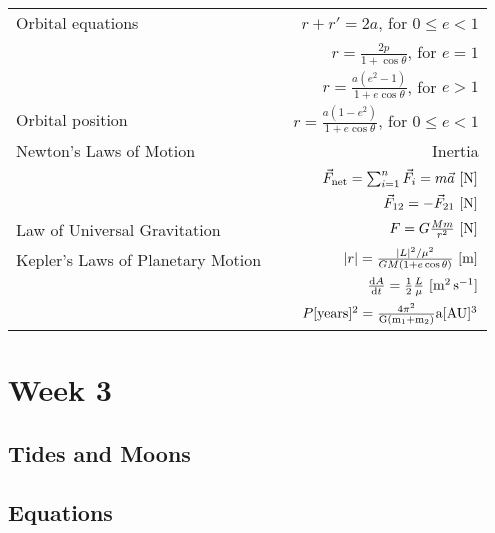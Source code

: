 \documentclass[a4paper,10pt]{article}
\begin{document}
\begin{tabularx}{\textwidth}{ l X r }

    Orbital equations && $r + r' = 2a$, for $0\leq e<1$ \\[0.3cm]
                      && $r = \frac{2p}{1+\cos\theta}$, for $e=1$ \\[0.3cm]
                      && $r = \frac{a(e^2-1)}{1+e\cos\theta}$, for $e>1$ \\[0.3cm]

    Orbital position && $r = \frac{a(1-e^2)}{1+e\cos\theta}$, for $0\leq e<1$ \\[0.3cm]

    Newton's Laws of Motion && Inertia \\[0.3cm]
                            &&$\vec{F}_{\rm net} = \sum_{i=1}^n \vec{F}_i = m\vec{a}~[{\rm N}]$ \\[0.3cm]
                            && $\vec{F}_{12} = -\vec{F}_{21}~[{\rm N}]$ \\[0.3cm]
    
    Law of Universal Gravitation && $F = G\frac{Mm}{r^2}~[\rm N]$ \\[0.3cm]

    Kepler's Laws of Planetary Motion && $|r| = \frac{|L|^2/\mu^2}{GM(1+e\cos\theta)}~[{\rm m}]$ \\[0.3cm]
                                      && $\frac{{\rm d}A}{{\rm d}t} = \frac{1}{2}\frac{L}{\mu}~[\rm m^2\,s^{-1}]$ \\[0.3cm]
                                      && $P[\rm years]^2 = \frac{4\pi^2}{G(m_1+m_2)}a[\rm AU]^3$ \\[0.3cm]
\end{tabularx}




\newpage
\section{Week 3}

\subsection{Tides and Moons}

\subsection{Equations}
\end{document}

